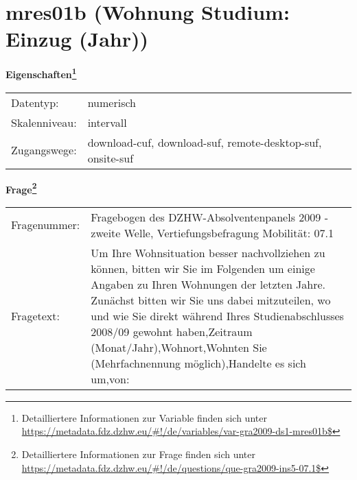 
    \setcounter{footnote}{0}

    \vspace*{-1.8cm}
	\section{mres01b (Wohnung Studium: Einzug (Jahr))}
	\label{section:mres01b}



    \vspace*{0.5cm}
    \noindent\textbf{Eigenschaften\footnote{Detailliertere Informationen zur Variable finden sich unter
		\url{https://metadata.fdz.dzhw.eu/\#!/de/variables/var-gra2009-ds1-mres01b$}}}\\
	\begin{tabularx}{\hsize}{@{}lX}
	Datentyp: & numerisch \\
	Skalenniveau: & intervall \\
	Zugangswege: &
	  download-cuf, 
	  download-suf, 
	  remote-desktop-suf, 
	  onsite-suf
 \\
    \end{tabularx}



				\vspace*{0.5cm}
                \noindent\textbf{Frage\footnote{Detailliertere Informationen zur Frage finden sich unter
		              \url{https://metadata.fdz.dzhw.eu/\#!/de/questions/que-gra2009-ins5-07.1$}}}\\
				\begin{tabularx}{\hsize}{@{}lX}
					Fragenummer: &
					  Fragebogen des DZHW-Absolventenpanels 2009 - zweite Welle, Vertiefungsbefragung Mobilität:
					  07.1
 \\
					Fragetext: & Um Ihre Wohnsituation besser nachvollziehen zu können, bitten wir Sie im Folgenden um einige Angaben zu Ihren Wohnungen der letzten Jahre. Zunächst bitten wir Sie uns dabei mitzuteilen, wo und wie Sie direkt während Ihres Studienabschlusses 2008/09 gewohnt haben,Zeitraum (Monat/Jahr),Wohnort,Wohnten Sie (Mehrfachnennung möglich),Handelte es sich um,von: \\
				\end{tabularx}






